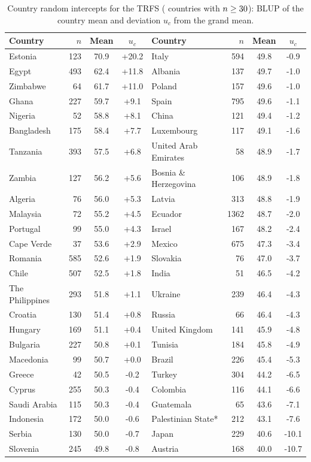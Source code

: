 \begin{table}[!htbp]
\centering
\caption{Country random intercepts for the TRFS (\MlCountries{} countries with $n\ge30$): BLUP of the country mean and deviation $u_c$ from the grand mean.}
\label{tab:A-country}
\scriptsize
\begin{tabular}{lrcc|lrcc}
\toprule
Country & $n$ & Mean & $u_c$ & Country & $n$ & Mean & $u_c$\\
\midrule
Estonia & 123 & 70.9 & +20.2 & Italy & 594 & 49.8 & -0.9\\
Egypt & 493 & 62.4 & +11.8 & Albania & 137 & 49.7 & -1.0\\
Zimbabwe & 64 & 61.7 & +11.0 & Poland & 157 & 49.6 & -1.0\\
Ghana & 227 & 59.7 & +9.1 & Spain & 795 & 49.6 & -1.1\\
Nigeria & 52 & 58.8 & +8.1 & China & 121 & 49.4 & -1.2\\
Bangladesh & 175 & 58.4 & +7.7 & Luxembourg & 117 & 49.1 & -1.6\\
Tanzania & 393 & 57.5 & +6.8 & United Arab Emirates & 58 & 48.9 & -1.7\\
Zambia & 127 & 56.2 & +5.6 & Bosnia \& Herzegovina & 106 & 48.9 & -1.8\\
Algeria & 76 & 56.0 & +5.3 & Latvia & 313 & 48.8 & -1.9\\
Malaysia & 72 & 55.2 & +4.5 & Ecuador & 1362 & 48.7 & -2.0\\
Portugal & 99 & 55.0 & +4.3 & Israel & 167 & 48.2 & -2.4\\
Cape Verde & 37 & 53.6 & +2.9 & Mexico & 675 & 47.3 & -3.4\\
Romania & 585 & 52.6 & +1.9 & Slovakia & 76 & 47.0 & -3.7\\
Chile & 507 & 52.5 & +1.8 & India & 51 & 46.5 & -4.2\\
The Philippines & 293 & 51.8 & +1.1 & Ukraine & 239 & 46.4 & -4.3\\
Croatia & 130 & 51.4 & +0.8 & Russia & 66 & 46.4 & -4.3\\
Hungary & 169 & 51.1 & +0.4 & United Kingdom & 141 & 45.9 & -4.8\\
Bulgaria & 227 & 50.8 & +0.1 & Tunisia & 184 & 45.8 & -4.9\\
Macedonia & 99 & 50.7 & +0.0 & Brazil & 226 & 45.4 & -5.3\\
Greece & 42 & 50.5 & -0.2 & Turkey & 304 & 44.2 & -6.5\\
Cyprus & 255 & 50.3 & -0.4 & Colombia & 116 & 44.1 & -6.6\\
Saudi Arabia & 115 & 50.3 & -0.4 & Guatemala & 65 & 43.6 & -7.1\\
Indonesia & 172 & 50.0 & -0.6 & Palestinian State* & 212 & 43.1 & -7.6\\
Serbia & 130 & 50.0 & -0.7 & Japan & 229 & 40.6 & -10.1\\
Slovenia & 245 & 49.8 & -0.8 & Austria & 168 & 40.0 & -10.7\\
\bottomrule
\end{tabular}
\end{table}
